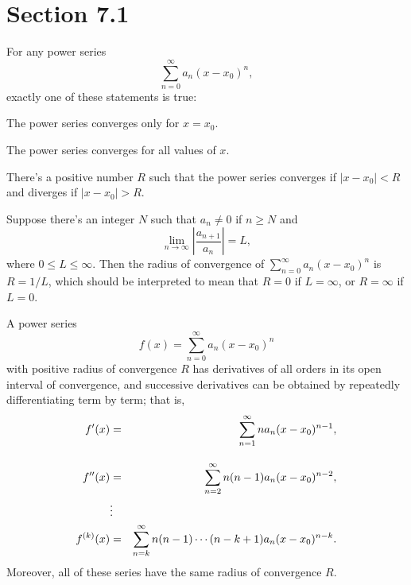 \section*{Section 7.1}
{}
\setcounter{chapter}{7}
\setcounter{section}{1}

\setcounter{theorem}{1}
\begin{theorem}
  \label{thmtype:7.1.2} For any power series
  \[
    \sum_{n=0}^{\infty}a_{n}(x-x_{0})^{n},
  \]
  exactly one of these statements is true:
  \begin{rmlist}
    \item %
    The power series converges only for $x=x_{0}$.

    \item %
    The power series converges for all values of $x$.

    \item %
    There's a positive number $R$ such that the power series converges if $|x-x_{0}|<R$ and diverges
    if $|x-x_{0}|>R$.
  \end{rmlist}
\end{theorem}

\setcounter{theorem}{2}
\begin{theorem}
  \label{thmtype:7.1.3} Suppose there's an integer $N$ such that $a_{n}\ne0$ if $n\ge N$ and
  \[
    \lim_{n\to\infty}\left|\frac{a_{n+1}}{a_{n}}\right|=L,
  \]
  where $0\le L\le\infty$. Then the radius of convergence of $\sum_{n=0}^{\infty}a_{n}(x-x_{0})^{n}$
  is $R=1/L$, which should be interpreted to mean that $R=0$ if $L=\infty$, or $R=\infty$ if $L=0$.
\end{theorem}

\setcounter{theorem}{3}
\setcounter{equation}{5}
\begin{theorem}
  \label{thmtype:7.1.4} A power series
  \[
    f(x)=\sum_{n=0}^{\infty}a_{n}(x-x_{0})^{n}
  \]
  with positive radius of convergence $R$ has derivatives of all orders in its open interval of
  convergence, and successive derivatives can be obtained by repeatedly differentiating term by
  term; that is,
  \begin{eqnarray}
    f'(x)      & =      & \displaystyle{\sum_{n=1}^{\infty}na_{n}(x-x_{0})^{n-1}}\label{eq:7.1.6},      \\[10pt]
    f''(x)     & =      & \displaystyle{\sum_{n=2}^{\infty}n(n-1)a_{n}(x-x_{0})^{n-2}},\label{eq:7.1.7} \\
               & \vdots & \nonumber                                                            \\
    f^{(k)}(x) & =      & \displaystyle{\sum_{n=k}^{\infty}n(n-1)\cdots(n-k+1)a_{n}(x-x_{0})^{n-k}}\label{eq:7.1.8}.
  \end{eqnarray}
  Moreover, all of these series have the same radius of convergence $R$.
\end{theorem}

